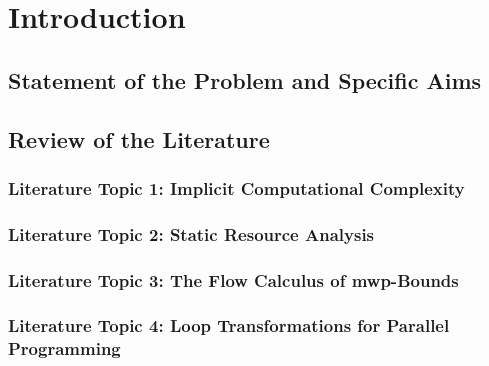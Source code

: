 \dedication{}

\begin{abstract}\end{abstract}

\mainmatter

\chapter{Introduction}\label{introduction}
\clearpage

    \section{Statement of the Problem and Specific Aims}\label{intro}
    
    \clearpage

    \section{Review of the Literature}\label{sec:pre}
    

        \subsection{Literature Topic 1: Implicit Computational Complexity}
        \label{icc}
        

        \subsection{Literature Topic 2: Static Resource Analysis}
        \label{static-analysis}
        

        \subsection{Literature Topic 3: The Flow Calculus of mwp-Bounds}
        \label{flow-calculus}
        

        \subsection{Literature Topic 4: Loop Transformations for Parallel
        Programming}\label{transforms}
        

